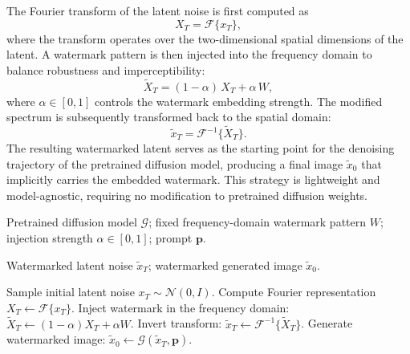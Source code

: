 \documentclass[lettersize,journal,review]{IEEEtran}
\begin{document}
The Fourier transform of the latent noise is first computed as
\begin{equation}
    X_T = \mathcal{F}\{x_T\},
\end{equation}
where the transform operates over the two-dimensional spatial dimensions of the latent.
A watermark pattern is then injected into the frequency domain to balance robustness and imperceptibility:
\begin{equation}
    \tilde{X}_T = (1-\alpha)\,X_T + \alpha\,W,
\end{equation}
where \(\alpha \in [0,1]\) controls the watermark embedding strength.
The modified spectrum is subsequently transformed back to the spatial domain:
\begin{equation}
    \tilde{x}_T = \mathcal{F}^{-1}\{\tilde{X}_T\}.
\end{equation}
The resulting watermarked latent serves as the starting point for the denoising trajectory of the pretrained diffusion model, producing a final image \(\tilde{x}_0\) that implicitly carries the embedded watermark.
This strategy is lightweight and model-agnostic, requiring no modification to pretrained diffusion weights.


\begin{algorithm}[t]
\caption{Watermark Injection and Watermarked Image Generation}
\label{alg:injection_generation}
\begin{algorithmic}[1]
\Require
Pretrained diffusion model $\mathcal{G}$;
fixed frequency-domain watermark pattern $W$;
injection strength $\alpha \in [0,1]$;
prompt $\mathbf{p}$.

\Ensure
Watermarked latent noise $\tilde{x}_T$;
watermarked generated image $\tilde{x}_0$.

\State Sample initial latent noise $x_T \sim \mathcal{N}(0,I)$.
\State Compute Fourier representation $X_T \leftarrow \mathcal{F}\{x_T\}$.
\State Inject watermark in the frequency domain:
\State \hspace{1.2em} $\tilde{X}_T \leftarrow (1-\alpha)X_T + \alpha W$.
\State Invert transform: $\tilde{x}_T \leftarrow \mathcal{F}^{-1}\{\tilde{X}_T\}$.
\State Generate watermarked image: $\tilde{x}_0 \leftarrow \mathcal{G}(\tilde{x}_T, \mathbf{p})$.
\end{algorithmic}
\end{algorithm}
\end{document}
